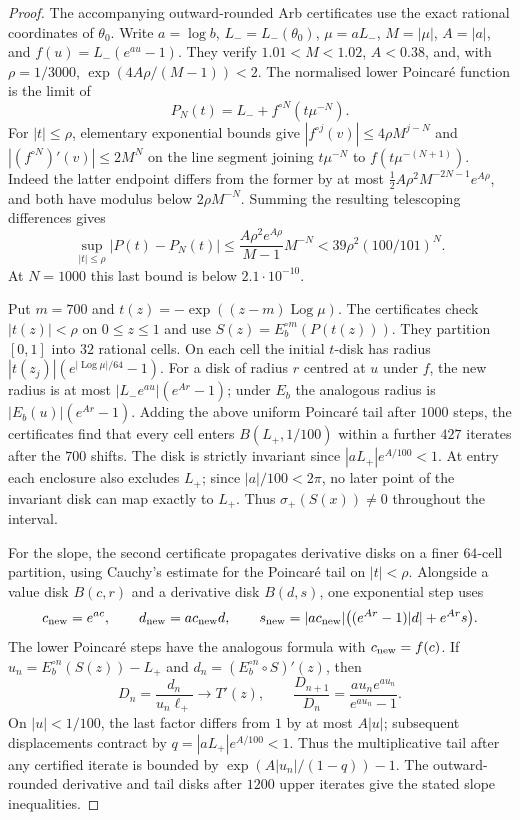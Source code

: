 \documentclass[11pt]{amsart}
\theoremstyle{definition}
\begin{document}
\begin{proof}
The accompanying outward-rounded Arb certificates use the exact
rational coordinates of $\theta_0$.  Write $a=\log b$, $L_-=L_-(\theta_0)$,
$\mu=aL_-$, $M=|\mu|$, $A=|a|$, and
$f(u)=L_-(e^{au}-1)$.  They verify
$1.01<M<1.02$, $A<0.38$, and, with $\rho=1/3000$,
$\exp(4A\rho/(M-1))<2$.  The normalised lower Poincar\'e
function is the limit of
\[
 P_N(t)=L_-+f^{\circ N}(t\mu^{-N}).
\]
For $|t|\le\rho$, elementary exponential bounds give
$|f^{\circ j}(v)|\le4\rho M^{j-N}$ and
$|(f^{\circ N})'(v)|\le2M^N$ on the line segment joining
$t\mu^{-N}$ to $f(t\mu^{-(N+1)})$.
Indeed the latter endpoint differs from the former by at most
$\frac12 A\rho^2M^{-2N-1}e^{A\rho}$, and both have modulus below
$2\rho M^{-N}$.  Summing the resulting telescoping differences gives
\[
 \sup_{|t|\le\rho}|P(t)-P_N(t)|
 \le \frac{A\rho^2e^{A\rho}}{M-1}M^{-N}
 <39\rho^2(100/101)^N.
\]
At $N=1000$ this last bound is below $2.1\cdot10^{-10}$.

Put $m=700$ and $t(z)=-\exp((z-m)\operatorname{Log}\mu)$.
The certificates check $|t(z)|<\rho$ on $0\le z\le1$ and use
$S(z)=E_b^{\circ m}(P(t(z)))$.  They partition $[0,1]$ into
$32$ rational cells.  On each cell the initial $t$-disk has radius
$|t(z_j)|(e^{|\operatorname{Log}\mu|/64}-1)$.  For a disk of radius $r$ centred
at $u$ under $f$, the new radius is at most
$|L_-e^{au}|(e^{Ar}-1)$; under $E_b$ the analogous radius is
$|E_b(u)|(e^{Ar}-1)$.  Adding the above uniform Poincar\'e tail
after $1000$ steps, the certificates find that every cell enters
$B(L_+,1/100)$ within a further $427$ iterates after the $700$
shifts.  The disk is strictly invariant since
$|aL_+|e^{A/100}<1$.  At entry each enclosure also excludes
$L_+$; since $|a|/100<2\pi$, no later point of the invariant
disk can map exactly to $L_+$.  Thus $\sigma_+(S(x))\ne0$
throughout the interval.

For the slope, the second certificate propagates derivative disks
on a finer $64$-cell partition, using Cauchy's estimate for the
Poincar\'e tail on $|t|<\rho$.  Alongside a value disk
$B(c,r)$ and a derivative disk $B(d,s)$, one exponential step uses
\[
 c_{\rm new}=e^{ac},\qquad d_{\rm new}=ac_{\rm new}d,\qquad
 s_{\rm new}=|ac_{\rm new}|
 \bigl((e^{Ar}-1)|d|+e^{Ar}s\bigr).
\]
The lower Poincar\'e steps have the analogous formula with
$c_{\rm new}=f(c)$.  If
$u_n=E_b^{\circ n}(S(z))-L_+$ and
$d_n=(E_b^{\circ n}\circ S)'(z)$, then
\[
 D_n=\frac{d_n}{u_n\ell_+}\longrightarrow T'(z),\qquad
 \frac{D_{n+1}}{D_n}
 =\frac{au_ne^{au_n}}{e^{au_n}-1}.
\]
On $|u|<1/100$, the last factor differs from $1$ by at most
$A|u|$; subsequent displacements contract by
$q=|aL_+|e^{A/100}<1$.  Thus the multiplicative tail after
any certified iterate is bounded by
$\exp(A|u_n|/(1-q))-1$.  The outward-rounded derivative and
tail disks after $1200$ upper iterates give the stated slope
inequalities.


\end{proof}
\end{document}
